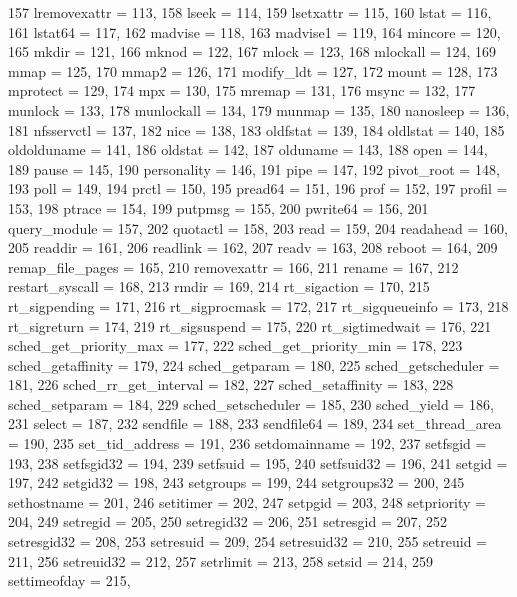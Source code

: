\begin{DoxyCode}
{157     lremovexattr = 113,
158     lseek = 114,
159     lsetxattr = 115,
160     lstat = 116,
161     lstat64 = 117,
162     madvise = 118,
163     madvise1 = 119,
164     mincore = 120,
165     mkdir = 121,
166     mknod = 122,
167     mlock = 123,
168     mlockall = 124,
169     mmap = 125,
170     mmap2 = 126,
171     modify_ldt = 127,
172     mount = 128,
173     mprotect = 129,
174     mpx = 130,
175     mremap = 131,
176     msync = 132,
177     munlock = 133,
178     munlockall = 134,
179     munmap = 135,
180     nanosleep = 136,
181     nfsservctl = 137,
182     nice = 138,
183     oldfstat = 139,
184     oldlstat = 140,
185     oldolduname = 141,
186     oldstat = 142,
187     olduname = 143,
188     open = 144,
189     pause = 145,
190     personality = 146,
191     pipe = 147,
192     pivot_root = 148,
193     poll = 149,
194     prctl = 150,
195     pread64 = 151,
196     prof = 152,
197     profil = 153,
198     ptrace = 154,
199     putpmsg = 155,
200     pwrite64 = 156,
201     query_module = 157,
202     quotactl = 158,
203     read = 159,
204     readahead = 160,
205     readdir = 161,
206     readlink = 162,
207     readv = 163,
208     reboot = 164,
209     remap_file_pages = 165,
210     removexattr = 166,
211     rename = 167,
212     restart_syscall = 168,
213     rmdir = 169,
214     rt_sigaction = 170,
215     rt_sigpending = 171,
216     rt_sigprocmask = 172,
217     rt_sigqueueinfo = 173,
218     rt_sigreturn = 174,
219     rt_sigsuspend = 175,
220     rt_sigtimedwait = 176,
221     sched_get_priority_max = 177,
222     sched_get_priority_min = 178,
223     sched_getaffinity = 179,
224     sched_getparam = 180,
225     sched_getscheduler = 181,
226     sched_rr_get_interval = 182,
227     sched_setaffinity = 183,
228     sched_setparam = 184,
229     sched_setscheduler = 185,
230     sched_yield = 186,
231     select = 187,
232     sendfile = 188,
233     sendfile64 = 189,
234     set_thread_area = 190,
235     set_tid_address = 191,
236     setdomainname = 192,
237     setfsgid = 193,
238     setfsgid32 = 194,
239     setfsuid = 195,
240     setfsuid32 = 196,
241     setgid = 197,
242     setgid32 = 198,
243     setgroups = 199,
244     setgroups32 = 200,
245     sethostname = 201,
246     setitimer = 202,
247     setpgid = 203,
248     setpriority = 204,
249     setregid = 205,
250     setregid32 = 206,
251     setresgid = 207,
252     setresgid32 = 208,
253     setresuid = 209,
254     setresuid32 = 210,
255     setreuid = 211,
256     setreuid32 = 212,
257     setrlimit = 213,
258     setsid = 214,
259     settimeofday = 215,
}
\end{DoxyCode}
